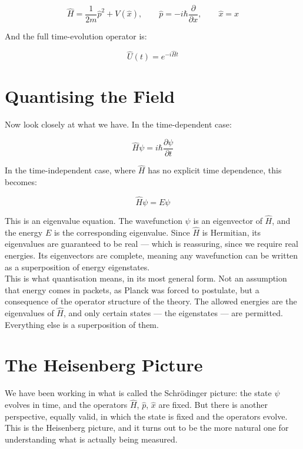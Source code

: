\documentclass[krantz1,ChapterTOCs]{krantz}
\begin{document}
$$\hat{H} = \frac{1}{2m}\hat{p}^2 + V(\hat{x}), 
\qquad \hat{p} = -i\hbar\frac{\partial}{\partial x}, 
\qquad \hat{x} = x$$

And the full time-evolution operator is:

$$\boxed{\hat{U}(t) = e^{-i\hat{H}t}}$$

\section*{Quantising the Field}

Now look closely at what we have. In the time-dependent case:

$$\hat{H}\psi = i\hbar\frac{\partial\psi}{\partial t} \tag{1}$$

In the time-independent case, where $\hat{H}$ has no explicit 
time dependence, this becomes:

$$\hat{H}\psi = E\psi \tag{2}$$

This is an eigenvalue equation. The wavefunction $\psi$ is an 
eigenvector of $\hat{H}$, and the energy $E$ is the corresponding 
eigenvalue. Since $\hat{H}$ is Hermitian, its eigenvalues are 
guaranteed to be real --- which is reassuring, since we require 
real energies. Its eigenvectors are complete, meaning any 
wavefunction can be written as a superposition of energy 
eigenstates.\\

This is what quantisation means, in its most general form. Not 
an assumption that energy comes in packets, as Planck was forced 
to postulate, but a consequence of the operator structure of the 
theory. The allowed energies are the eigenvalues of $\hat{H}$, 
and only certain states --- the eigenstates --- are permitted. 
Everything else is a superposition of them.\\

\section*{The Heisenberg Picture}

We have been working in what is called the Schr\"{o}dinger picture: 
the state $\psi$ evolves in time, and the operators $\hat{H}$, 
$\hat{p}$, $\hat{x}$ are fixed. But there is another perspective, 
equally valid, in which the state is fixed and the operators 
evolve. This is the Heisenberg picture, and it turns out to be 
the more natural one for understanding what is actually being 
measured.\\
\end{document}
